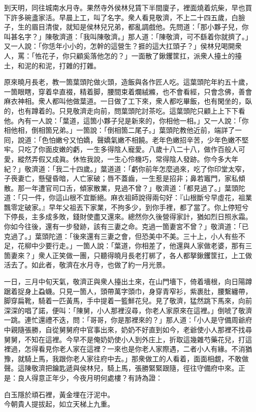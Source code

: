 到天明，同往城南水月寺。果然寺外侯林兒賃下半間廈子，{}裡面燒着炕柴，早也買下許多碗盞家活。早晨上工，叫了名字。衆人看見敬濟，不上二十四五歲，白臉子，生的眉目清俊，就知是侯林兒兄弟，都亂調戲他。先問道：「那小夥子兒，你叫甚名字？」陳敬濟道：「我叫陳敬濟。」那人道：「陳敬濟，可不繇着你就擠了。」又一人說：「你恁年小小的，怎幹的這營生？捱的這大扛頭子？」{}侯林兒喝開衆人，罵：「恠花子，你只顧奚落他怎的？」一面散了鍬钁筐扛，派衆人擡土的擡土，和泥的和泥，打雜的打雜。

原來曉月長老，教一箇葉頭陀做火頭，造飯與各作匠人吃。這葉頭陀年約五十歲，一箇眼瞎，穿着皁直裰，精着脚，腰間束着爛絨縧，也不會看經，只會念佛，善會麻衣神相。衆人都叫他做葉道。一日做了工下來，衆人都吃畢飯，也有閑坐的，臥的，也有蹲着的。{}只見敬濟走向前，問葉頭陀討茶吃。這葉頭陀只顧上上下下看他。內有一人說：「葉道，這箇小夥子兒是新來的，你相他一相。」又一人說：「你相他相，倒相箇兄弟。」一箇說：「倒相箇二尾子。」葉頭陀教他近前，端詳了一囘，說道：「色怕嫩兮又怕嬌，聲嬌氣嫩不相饒。老年色嫩招辛苦，少年色嫩不堅牢。只吃了你面皮嫩的虧，一生多得陰人寵愛。八歲十八二十八，做作百般人可愛，縱然弄假又成眞。休恠我說，一生心伶機巧，常得陰人發跡。你今多大年紀？」敬濟道：「我二十四歲。」葉道道：「虧你前年怎麼過來，吃了你印堂太窄，子䘮妻亡，懸璧昏暗，人亡家破；唇不蓋齒，一生惹是招非；鼻若竈門，家私傾散。那一年遭官司口舌，傾家散業，見過不曾？」敬濟道：「都見過了。」葉頭陀道：「只一件，你這山根不宜斷絕。麻衣祖師說得兩句好：『山根斷兮早虛花，祖業飄零定破家。』早年父祖丟下家業，不拘多少，到你手裡，都了當了。你上停短兮下停長，主多成多敗，錢財使盡又還來。總然你久後營得家計，猶如烈日照氷霜。你如今往後，還有一步發跡，該有三妻之命。克過一箇妻宮不曾？」敬濟道：「已克過了。」葉頭陀道：「後來還有三妻之會，但恐美中不美。三十上，小人有些不足，花柳中少要行走。」一箇人說：「葉道，你相差了，他還與人家做老婆，那有三箇妻來？」衆人正笑做一團，只聽得曉月長老打梆了，各人都拏鍬钁筐扛，上工做活去了。如此者，敬濟在水月寺，也做了約一月光景。

一日，三月中旬天氣，敬濟正與衆人擡出土來，在山門墻下，倚着墻根，向日陽蹲踞着捉身上蝨蟣。只見一箇人，頭帶萬字頭巾，身穿青窄衫，紫裹肚，腰繫纏帶，脚穿扁靴，騎着一匹黃馬，手中提着一籃鮮花兒。{}見了敬濟，猛然跳下馬來，向前深深的唱了諾，便叫：「陳舅，小人那裡沒尋，你老人家原來在這裡。」倒唬了敬濟一跳。連忙還禮不迭，問：「哥哥，你是那裡來的？」那人道：「小人是守備周爺府中親隨張勝，自從舅舅府中官事出來，奶奶不好直到如今，老爺使小人那裡不找尋舅舅，不知在這裡。今早不是俺奶奶使小人到外庄上，折取這幾雜芍藥花兒，打這裡過，怎得看見你老人家在這裡？一來也是你老人家際遇，二者小人有緣。不消猶豫，就騎上馬，我跟你老人家往府中去。」那衆做工的人看着，面面相覷，不敢做聲。{}這陳敬濟把鑰匙遞與侯林兒，騎上馬，張勝緊緊跟隨，徑往守備府中來。正是：良人得意正年少，今夜月明何處樓？有詩為證：

\begin{myquote}
白玉隱於頑石裡，黃金埋在汙泥中。\\今朝貴人提拔起，如立天梯上九重。
\end{myquote}

